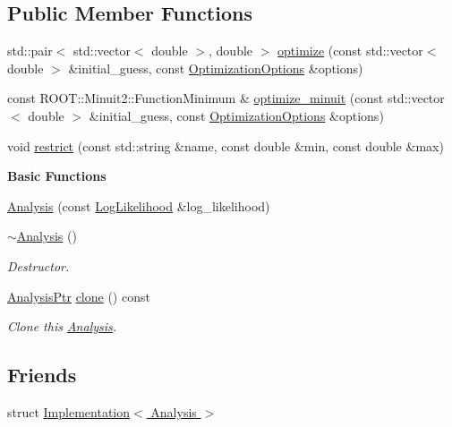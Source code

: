 \subsection*{Public Member Functions}
\begin{DoxyCompactItemize}
\item 
std::pair$<$ std::vector$<$ double $>$, double $>$ \hyperlink{classeos_1_1Analysis_ab558b84092479509d34d5f9ee0f03ad3}{optimize} (const std::vector$<$ double $>$ \&initial\_\-guess, const \hyperlink{structeos_1_1Analysis_1_1OptimizationOptions}{OptimizationOptions} \&options)
\item 
const ROOT::Minuit2::FunctionMinimum \& \hyperlink{classeos_1_1Analysis_a3f8c48eed78ea048627928613492eac5}{optimize\_\-minuit} (const std::vector$<$ double $>$ \&initial\_\-guess, const \hyperlink{structeos_1_1Analysis_1_1OptimizationOptions}{OptimizationOptions} \&options)
\item 
void \hyperlink{classeos_1_1Analysis_a0fa8a2b9d2f9dad49b0e76c83efde3ba}{restrict} (const std::string \&name, const double \&min, const double \&max)
\end{DoxyCompactItemize}
\begin{Indent}{\bf Basic Functions}\par
{\em \label{_amgrp2386c9a1f1785edee33f374dd2db9b3d}
 }\begin{DoxyCompactItemize}
\item 
\hyperlink{classeos_1_1Analysis_a252a0ae93caf7c7f6db627fe563c72bc}{Analysis} (const \hyperlink{classeos_1_1LogLikelihood}{LogLikelihood} \&log\_\-likelihood)
\item 
\hyperlink{classeos_1_1Analysis_a41c872da6c87e398f1807012262a2eff}{$\sim$Analysis} ()
\begin{DoxyCompactList}\small\item\em Destructor. \item\end{DoxyCompactList}\item 
\hyperlink{namespaceeos_afc57020492535ccdd85cfc3b7421340d}{AnalysisPtr} \hyperlink{classeos_1_1Analysis_a05e85c6fa4f83ef4b768c52d4c4f75bc}{clone} () const 
\begin{DoxyCompactList}\small\item\em Clone this \hyperlink{classeos_1_1Analysis}{Analysis}. \item\end{DoxyCompactList}\end{DoxyCompactItemize}
\end{Indent}
\subsection*{Friends}
\begin{DoxyCompactItemize}
\item 
struct \hyperlink{classeos_1_1Analysis_a63c3ad7e46dc3c7d599fe2faf2a2f55f}{Implementation$<$ Analysis $>$}
\end{DoxyCompactItemize}
